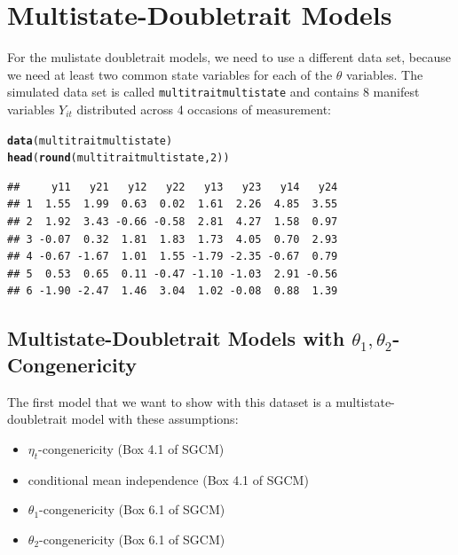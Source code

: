 \documentclass[10pt]{article}\usepackage{graphicx, color}
\makeatletter
\newcommand{\hlfunctioncall}[1]{\textcolor[rgb]{0.501960784313725,0,0.329411764705882}{\textbf{#1}}}%
\newenvironment{kframe}{%
 \def\at@end@of@kframe{}%
 \ifinner\ifhmode%
  \def\at@end@of@kframe{\end{minipage}}%
  \begin{minipage}{\columnwidth}%
 \fi\fi%
 \def\FrameCommand##1{\hskip\@totalleftmargin \hskip-\fboxsep
 \colorbox{shadecolor}{##1}\hskip-\fboxsep
     \hskip-\linewidth \hskip-\@totalleftmargin \hskip\columnwidth}%
 \MakeFramed {\advance\hsize-\width
   \@totalleftmargin\z@ \linewidth\hsize
   \@setminipage}}%
 {\par\unskip\endMakeFramed%
 \at@end@of@kframe}
\newenvironment{knitrout}{}{} %
\makeatother
\begin{document}
%



\newpage
\section{Multistate-Doubletrait Models}

For the mulistate doubletrait models, we need to use a different data set, because we need at least two common state variables for each of the $\theta$ variables. The simulated data set is called \texttt{multitraitmultistate} and contains 8 manifest variables $Y_{it}$ distributed across 4 occasions of measurement:

%
\begin{knitrout}
\color{fgcolor}\begin{kframe}
\begin{alltt}
\hlfunctioncall{data}(multitraitmultistate)
\hlfunctioncall{head}(\hlfunctioncall{round}(multitraitmultistate, 2))
\end{alltt}
\begin{verbatim}
##     y11   y21   y12   y22   y13   y23   y14   y24
## 1  1.55  1.99  0.63  0.02  1.61  2.26  4.85  3.55
## 2  1.92  3.43 -0.66 -0.58  2.81  4.27  1.58  0.97
## 3 -0.07  0.32  1.81  1.83  1.73  4.05  0.70  2.93
## 4 -0.67 -1.67  1.01  1.55 -1.79 -2.35 -0.67  0.79
## 5  0.53  0.65  0.11 -0.47 -1.10 -1.03  2.91 -0.56
## 6 -1.90 -2.47  1.46  3.04  1.02 -0.08  0.88  1.39
\end{verbatim}
\end{kframe}
\end{knitrout}

%



\subsection{Multistate-Doubletrait Models with $\theta_1,\theta_2$-Congenericity}


The first model that we want to show with this dataset is a multistate-doubletrait model with these assumptions:
%
\begin{itemize}
  \item $\eta_t$-congenericity (Box 4.1 of SGCM)
  \item conditional mean independence (Box 4.1 of SGCM)
  \item $\theta_1$-congenericity (Box 6.1 of SGCM)
  \item $\theta_2$-congenericity (Box 6.1 of SGCM)
\end{itemize}
%
\end{document}
